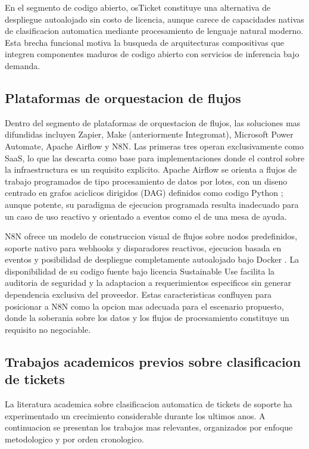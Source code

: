 En el segmento de codigo abierto, osTicket constituye una alternativa de despliegue autoalojado sin costo de licencia, aunque carece de capacidades nativas de clasificacion automatica mediante procesamiento de lenguaje natural moderno. Esta brecha funcional motiva la busqueda de arquitecturas compositivas que integren componentes maduros de codigo abierto con servicios de inferencia bajo demanda.

\subsection{Plataformas de orquestacion de flujos}

Dentro del segmento de plataformas de orquestacion de flujos, las soluciones mas difundidas incluyen Zapier, Make (anteriormente Integromat), Microsoft Power Automate, Apache Airflow y N8N. Las primeras tres operan exclusivamente como SaaS, lo que las descarta como base para implementaciones donde el control sobre la infraestructura es un requisito explicito. Apache Airflow se orienta a flujos de trabajo programados de tipo procesamiento de datos por lotes, con un diseno centrado en grafos aciclicos dirigidos (DAG) definidos como codigo Python \parencite{Apache2024_airflow}; aunque potente, su paradigma de ejecucion programada resulta inadecuado para un caso de uso reactivo y orientado a eventos como el de una mesa de ayuda.

N8N ofrece un modelo de construccion visual de flujos sobre nodos predefinidos, soporte nativo para webhooks y disparadores reactivos, ejecucion basada en eventos y posibilidad de despliegue completamente autoalojado bajo Docker \parencite{n8n2024_docs}. La disponibilidad de su codigo fuente bajo licencia Sustainable Use facilita la auditoria de seguridad y la adaptacion a requerimientos especificos sin generar dependencia exclusiva del proveedor. Estas caracteristicas confluyen para posicionar a N8N como la opcion mas adecuada para el escenario propuesto, donde la soberania sobre los datos y los flujos de procesamiento constituye un requisito no negociable.

\subsection{Trabajos academicos previos sobre clasificacion de tickets}

La literatura academica sobre clasificacion automatica de tickets de soporte ha experimentado un crecimiento considerable durante los ultimos anos. A continuacion se presentan los trabajos mas relevantes, organizados por enfoque metodologico y por orden cronologico.

